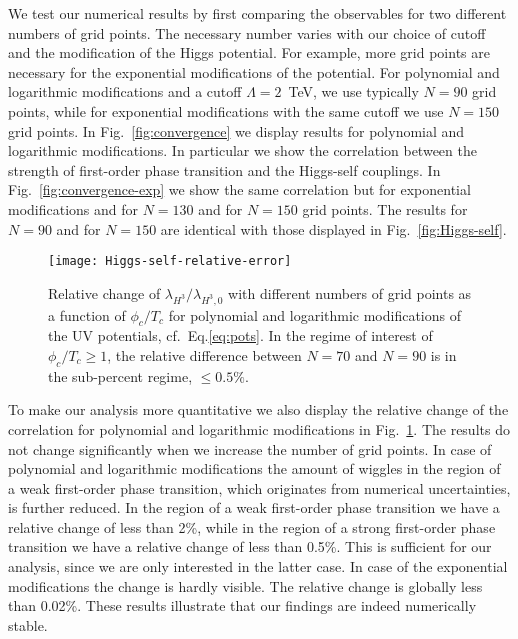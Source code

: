 \documentclass[aps,prd,11pt,tightenlines,superscriptaddress,nofootinbib,preprintnumbers,notitlepage]{revtex4-1}
\begin{document}
We test our numerical results by first comparing the observables for two
different numbers of grid points.  The necessary number varies with
our choice of cutoff and the modification of the Higgs potential.  For
example, more grid points are necessary for the exponential
modifications of the potential.  For polynomial and logarithmic
modifications and a cutoff $\Lambda=2$~TeV, we use typically $N=90$
grid points, while for exponential modifications with the same cutoff
we use $N=150$ grid points.
In Fig.~\ref{fig:convergence} we display results for polynomial and
logarithmic modifications. In
particular we show the correlation between the strength of
first-order phase transition and the Higgs-self couplings.  In
Fig.~\ref{fig:convergence-exp} we show the same correlation but for
exponential modifications and for $N=130$ and for $N=150$ grid points.
The results for $N=90$ and for $N=150$ are identical with those
displayed in Fig.~\ref{fig:Higgs-self}.

\begin{figure}[t]
 \texttt{[image: Higgs-self-relative-error]}
 \caption{Relative change of $\lambda_{H^3}/\lambda_{H^3,0}$ with
   different numbers of grid points as a function of $\phi_c/T_c$ for
   polynomial and logarithmic modifications of the UV potentials,
   cf.~Eq.\eqref{eq:pots}.  In the regime of interest of $\phi_c/T_c
   \geq 1$, the relative difference between $N=70$ and $N=90$ is in
   the sub-percent regime, $\leq 0.5 \%$.}
 \label{fig:relative-error}
\end{figure}

To make our analysis more quantitative we also display the relative
change of the correlation for polynomial and logarithmic modifications
in Fig.~\ref{fig:relative-error}.  The results do not change
significantly when we increase the number of grid points.  In case of
polynomial and logarithmic modifications the amount of wiggles in the
region of a weak first-order phase transition, which originates from
numerical uncertainties, is further reduced.  In the region of a weak
first-order phase transition we have a relative change of less than
2\%, while in the region of a strong first-order phase transition we
have a relative change of less than 0.5\%.  This is sufficient for our
analysis, since we are only interested in the latter case.  In case of
the exponential modifications the change is hardly visible.  The
relative change is globally less than 0.02\%. These results illustrate
that our findings are indeed numerically stable.\bigskip
\end{document}
